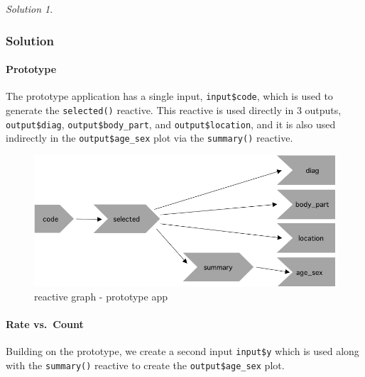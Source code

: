 \documentclass[
]{book}
\theoremstyle{definition}
\theoremstyle{definition}
\theoremstyle{definition}
\theoremstyle{definition}
\theoremstyle{remark}
\newtheorem*{solution}{Solution}
\begin{document}
\begin{solution}
\leavevmode

\hypertarget{solution-18}{%
\subsubsection*{Solution}\label{solution-18}}

\hypertarget{prototype}{%
\paragraph*{Prototype}\label{prototype}}

The prototype application has a single input, \texttt{input\$code}, which is used to
generate the \texttt{selected()} reactive. This reactive is used directly in 3
outputs, \texttt{output\$diag}, \texttt{output\$body\_part}, and \texttt{output\$location}, and it is
also used indirectly in the \texttt{output\$age\_sex} plot via the \texttt{summary()} reactive.

\begin{figure}
\centering
\includegraphics[width=5.20833in,height=\textheight]{images/5.8.1-prototype.png}
\caption{reactive graph - prototype app}
\end{figure}

\hypertarget{rate-vs.-count}{%
\paragraph*{Rate vs.~Count}\label{rate-vs.-count}}

Building on the prototype, we create a second input \texttt{input\$y} which is used
along with the \texttt{summary()} reactive to create the \texttt{output\$age\_sex} plot.


\end{solution}
\end{document}
